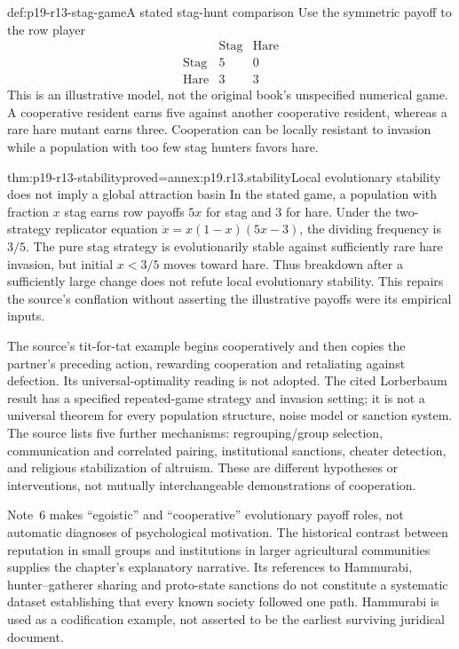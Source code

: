 \begin{hbexample}{def:p19-r13-stag-game}{A stated stag-hunt comparison}
Use the symmetric payoff to the row player
\[
\begin{array}{c|cc}
 &\text{Stag}&\text{Hare}\\\hline
\text{Stag}&5&0\\
\text{Hare}&3&3
\end{array}
\]
This is an illustrative model, not the original book's unspecified numerical
game. A cooperative resident earns five against another cooperative resident,
whereas a rare hare mutant earns three. Cooperation can be locally resistant
to invasion while a population with too few stag hunters favors hare.
\end{hbexample}

\begin{hblemma}{thm:p19-r13-stability}{proved=annex:p19.r13.stability}{Local evolutionary stability does not imply a global attraction basin}
In the stated game, a population with fraction \(x\) stag earns row payoffs
\(5x\) for stag and \(3\) for hare. Under the two-strategy replicator
equation \(\dot x=x(1-x)(5x-3)\), the dividing frequency is \(3/5\).
The pure stag strategy is evolutionarily stable against sufficiently rare
hare invasion, but initial \(x<3/5\) moves toward hare. Thus breakdown
after a sufficiently large change does not refute local evolutionary
stability. This repairs the source's conflation without asserting the
illustrative payoffs were its empirical inputs.
\end{hblemma}

The source's tit-for-tat example begins cooperatively and then copies the
partner's preceding action, rewarding cooperation and retaliating against
defection. Its universal-optimality reading is not adopted. The cited
Lorberbaum result has a specified repeated-game strategy and invasion
setting; it is not a universal theorem for every population structure,
noise model or sanction system. The source lists five further mechanisms:
regrouping/group selection, communication and correlated pairing,
institutional sanctions, cheater detection, and religious stabilization of
altruism. These are different hypotheses or interventions, not mutually
interchangeable demonstrations of cooperation.

Note~6 makes ``egoistic'' and ``cooperative'' evolutionary payoff roles,
not automatic diagnoses of psychological motivation. The historical contrast
between reputation in small groups and institutions in larger agricultural
communities supplies the chapter's explanatory narrative. Its references
to Hammurabi, hunter--gatherer sharing and proto-state sanctions do not
constitute a systematic dataset establishing that every known society
followed one path. Hammurabi is used as a codification example, not asserted
to be the earliest surviving juridical document.

